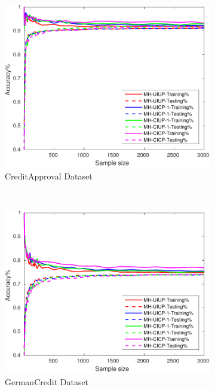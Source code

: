 \begin{figure}[ht]
\begin{subfigure}[b]{0.3\textwidth}
		\centering
  	\includegraphics[width=\textwidth]{figs/PLPTF/Trees/CreditApprovalDownsampledFurther_Trees_MH.pdf}
  	\caption{CreditApproval Dataset}
		\label{fig:Crd2}
	\end{subfigure}
  \\
  \begin{subfigure}[b]{0.3\textwidth}
		\centering
  	\includegraphics[width=\textwidth]{figs/PLPTF/Trees/GermanCreditDownsampledFurther_Trees_MH.pdf}
  	\caption{GermanCredit Dataset}
		\label{fig:G2}
	\end{subfigure}
  \begin{subfigure}[b]{0.3\textwidth}

\end{subfigure}
\end{figure}

